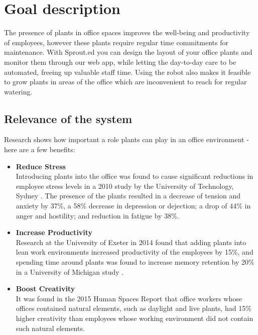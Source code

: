\documentclass{article}
\begin{document}
\section{Goal description} 
The presence of plants in office spaces improves the well-being and productivity of employees, however these plants require regular time commitments for maintenance. With Sprout.ed you can design the layout of your office plants and monitor them through our web app, while letting the day-to-day care to be automated, freeing up valuable staff time. Using the robot also makes it feasible to grow plants in areas of the office which are inconvenient to reach for regular watering.

\subsection{Relevance of the system} 
 Research shows how important a role plants can play in an office environment - here are a few benefits:

\begin{itemize}
\item \textbf{Reduce Stress} \\
Introducing plants into the office was found to cause significant reductions in employee stress levels in a 2010 study by the University of Technology, Sydney \cite{craig_torpy_brennan_burchett_2010}. The presence of the plants resulted in a decrease of tension and anxiety by 37\%, a 58\% decrease in depression or dejection; a drop of 44\% in anger and hostility; and reduction in fatigue by 38\%. 
	
\item \textbf{Increase Productivity} \\
Research at the University of Exeter \cite{malik_2014} in 2014 found that adding plants into lean work environments increased productivity of the employees by 15\%, and spending time around plants was found to increase memory retention by 20\% in a University of Michigan study \cite{university_of_michigan_news_2008}.

\item \textbf{Boost Creativity} \\
It was found in the 2015 Human Spaces Report \cite{browning_2015} that office workers whose offices contained natural elements, such as daylight and live plants, had 15\% higher creativity than employees whose working environment did not contain such natural elements.

\end{itemize}
\end{document}
